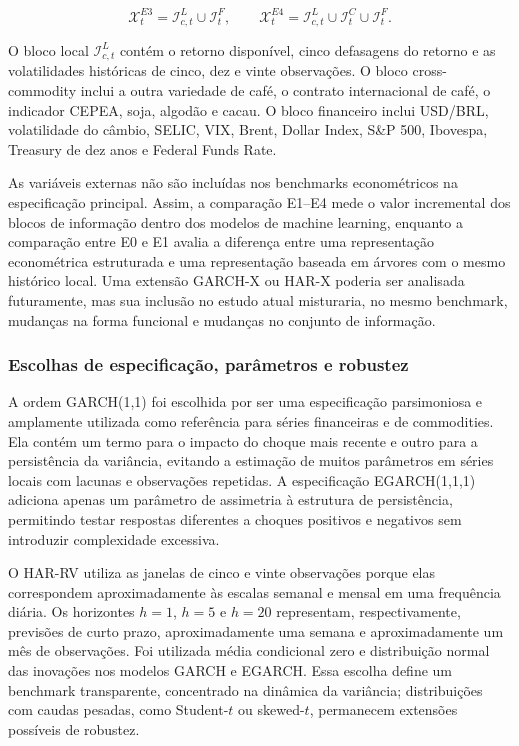 \documentclass[a4paper,fleqn]{cas-sc}
\begin{document}
\begin{equation}
\mathcal{X}^{E3}_{t}=\mathcal{I}^{L}_{c,t}\cup\mathcal{I}^{F}_{t},
\qquad
\mathcal{X}^{E4}_{t}=\mathcal{I}^{L}_{c,t}\cup\mathcal{I}^{C}_{t}\cup\mathcal{I}^{F}_{t}.
\end{equation}

O bloco local \(\mathcal{I}^{L}_{c,t}\) contém o retorno disponível, cinco defasagens do retorno e as volatilidades históricas de cinco, dez e vinte observações. O bloco cross-commodity inclui a outra variedade de café, o contrato internacional de café, o indicador CEPEA, soja, algodão e cacau. O bloco financeiro inclui USD/BRL, volatilidade do câmbio, SELIC, VIX, Brent, Dollar Index, S\&P 500, Ibovespa, Treasury de dez anos e Federal Funds Rate.

As variáveis externas não são incluídas nos benchmarks econométricos na especificação principal. Assim, a comparação E1--E4 mede o valor incremental dos blocos de informação dentro dos modelos de machine learning, enquanto a comparação entre E0 e E1 avalia a diferença entre uma representação econométrica estruturada e uma representação baseada em árvores com o mesmo histórico local. Uma extensão GARCH-X ou HAR-X poderia ser analisada futuramente, mas sua inclusão no estudo atual misturaria, no mesmo benchmark, mudanças na forma funcional e mudanças no conjunto de informação.

\subsubsection{Escolhas de especificação, parâmetros e robustez}

A ordem GARCH(1,1) foi escolhida por ser uma especificação parsimoniosa e amplamente utilizada como referência para séries financeiras e de commodities. Ela contém um termo para o impacto do choque mais recente e outro para a persistência da variância, evitando a estimação de muitos parâmetros em séries locais com lacunas e observações repetidas. A especificação EGARCH(1,1,1) adiciona apenas um parâmetro de assimetria à estrutura de persistência, permitindo testar respostas diferentes a choques positivos e negativos sem introduzir complexidade excessiva.

O HAR-RV utiliza as janelas de cinco e vinte observações porque elas correspondem aproximadamente às escalas semanal e mensal em uma frequência diária. Os horizontes \(h=1\), \(h=5\) e \(h=20\) representam, respectivamente, previsões de curto prazo, aproximadamente uma semana e aproximadamente um mês de observações. Foi utilizada média condicional zero e distribuição normal das inovações nos modelos GARCH e EGARCH. Essa escolha define um benchmark transparente, concentrado na dinâmica da variância; distribuições com caudas pesadas, como Student-$t$ ou skewed-$t$, permanecem extensões possíveis de robustez.
\end{document}

